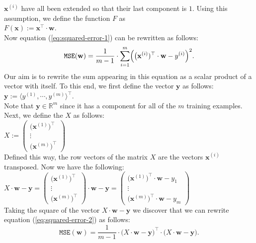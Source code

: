 $\mathbf{x}^{(i)}$ have all been extended so that their last component is $1$.  Using this
assumption,  we define the
function $F$ as
\\[0.2cm]
\hspace*{1.3cm}
$F(\mathbf{x}) := \mathbf{x}^\top \cdot \mathbf{w}$.
\\[0.2cm]
Now equation (\ref{eq:squared-error-1}) can be rewritten as follows:
\begin{equation}
  \label{eq:squared-error-2}
  \mathtt{MSE}(\mathbf{w}) = \frac{1}{m-1} \cdot \sum\limits_{i=1}^m \Bigl(\bigl(\mathbf{x}^{(i)})^\top \cdot \mathbf{w}  - y^{(i)}\Bigr)^2.
\end{equation}
Our aim is to rewrite the sum appearing in this equation as a scalar product of a vector with
itself.  To this end, we first define the vector $\mathbf{y}$ as follows:
\\[0.2cm]
\hspace*{1.3cm}
$\mathbf{y} := \langle y^{(1)}, \cdots, y^{(m)} \rangle^\top$.
\\[0.2cm]
Note that $\mathbf{y} \in \mathbb{R}^m$ since it has a component for all of the $m$ training
examples.  Next, we define the  $X$ as follows:
\\[0.2cm]
\hspace*{1.3cm}
$X := \left(
  \begin{array}{c}
    \bigl(\mathbf{x}^{(1)}\bigr)^\top  \\
    \vdots                         \\
    \bigl(\mathbf{x}^{(m)}\bigr)^\top
  \end{array}
  \right)   
$
\\[0.2cm]
Defined this way, the row vectors of the matrix $X$ are the vectors $\mathbf{x}^{(i)}$ transposed.
Now we have the following:
\\[0.2cm]
\hspace*{1.3cm}
$X \cdot \mathbf{w} - \mathbf{y} = \left(
  \begin{array}{c}
    \bigl(\mathbf{x}^{(1)}\bigr)^\top  \\
    \vdots                         \\
    \bigl(\mathbf{x}^{(m)}\bigr)^\top
  \end{array}
  \right) \cdot \mathbf{w} - \mathbf{y} = \left(
  \begin{array}{c}
    \bigl(\mathbf{x}^{(1)}\bigr)^\top \cdot \mathbf{w} - y_1 \\
    \vdots                         \\
    \bigl(\mathbf{x}^{(m)}\bigr)^\top \cdot \mathbf{w} - y_m
  \end{array}
  \right)
$
\\[0.2cm]
Taking the square of the vector $X \cdot \mathbf{w} - \mathbf{y}$ we discover that
we can rewrite equation (\ref{eq:squared-error-2}) as follows:
\begin{equation}
  \label{eq:squared-error-3}
  \mathtt{MSE}(\mathbf{w}) = \frac{1}{m-1} \cdot \bigl(X \cdot \mathbf{w} - \textbf{y}\bigr)^\top \cdot 
                                            \bigl(X \cdot \mathbf{w} - \textbf{y}\bigr).
\end{equation}

